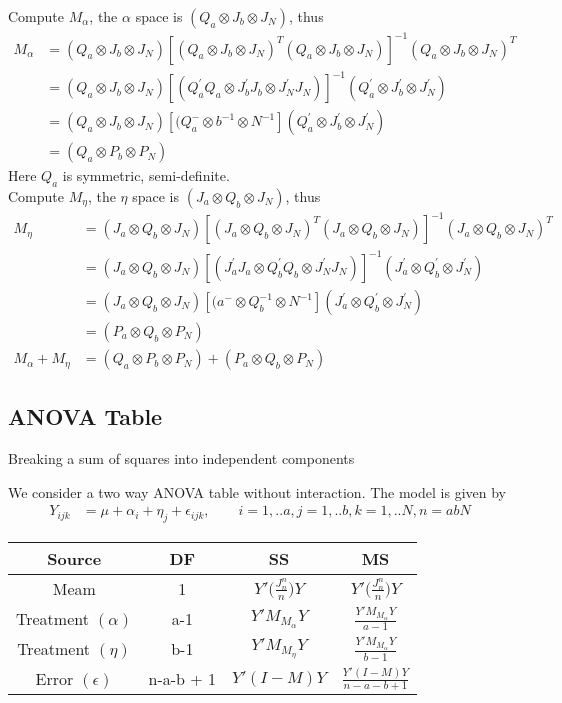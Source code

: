 \begin{itemize}
Compute $M_\alpha$, the $\alpha$ space is $(Q_a \otimes J_b \otimes J_N)$, thus
 \begin{align*}
    M_\alpha &= (Q_a \otimes J_b \otimes J_N) [(Q_a \otimes J_b \otimes J_N)^{T}(Q_a \otimes J_b \otimes J_N)]^{-1} (Q_a \otimes J_b \otimes J_N)^{T}\\
     &= (Q_a \otimes J_b \otimes J_N) [(Q_a ^{'}Q_a\otimes J_b^{'}J_b \otimes J_N^{'}J_N)]^{-1}(Q_a^{'} \otimes J_b^{'} \otimes J_N^{'})\\ 
     &= (Q_a \otimes J_b \otimes J_N) [(Q_a^{-}\otimes b^{-1} \otimes N^{-1}](Q_a^{'} \otimes J_b^{'} \otimes J_N^{'})\\
     & = (Q_a \otimes P_b \otimes P_N) 
\end{align*}
    Here $Q_a$ is symmetric, semi-definite.\\
    Compute $M_\eta$, the $\eta$ space is $(J_a \otimes Q_b \otimes J_N)$, thus
 \begin{align*}
    M_\eta &= (J_a \otimes Q_b \otimes J_N) [(J_a \otimes Q_b \otimes J_N)^{T}(J_a \otimes Q_b \otimes J_N)]^{-1} (J_a \otimes Q_b \otimes J_N)^{T}\\
     &= (J_a \otimes Q_b \otimes J_N) [(J_a ^{'}J_a\otimes Q_b^{'}Q_b \otimes J_N^{'}J_N)]^{-1}(J_a^{'} \otimes Q_b^{'} \otimes J_N^{'})\\
     & = (J_a \otimes Q_b \otimes J_N) [(a^{-}\otimes Q_b^{-1} \otimes N^{-1}](J_a^{'} \otimes Q_b^{'} \otimes J_N^{'})\\
     & = (P_a \otimes Q_b \otimes P_N) \\
     M_\alpha + M_\eta &=(Q_a \otimes P_b \otimes P_N) + (P_a \otimes Q_b \otimes P_N) 
\end{align*}  
\end{itemize}


\subsection{ANOVA Table}

Breaking a sum of squares into independent components

We consider a two way ANOVA table without interaction. The model is given by
 \begin{align*}
    Y_{ijk} &= \mu + \alpha_i + \eta_j + \epsilon_{ijk}, \qquad i=1,..a, j=1,.. b, k=1,..N, n=abN   
\end{align*}

\begin{center}
\begin{tabular}{ |c|c|c|c| } 
 \hline
 Source & DF & SS & MS \\ 
  \hline
 Meam & 1 & $Y' \Big(\frac{J_n^n}{n} \Big) Y$  &$Y' \Big(\frac{J_n^n}{n} \Big) Y$ \\ 
Treatment $(\alpha)$ & a-1 & $Y' M_{M_{\alpha}} Y$ & $ \frac{Y' M_{M_{\alpha}} Y}{a-1}$ \\ 
Treatment $(\eta)$ & b-1 & $Y' M_{M_{\eta}} Y$ & $ \frac{Y' M_{M_{\alpha}} Y}{b-1}$ \\ 
Error $(\epsilon)$ & n-a-b + 1 & $Y' (I-M) Y$ & $ \frac{Y' (I-M) Y}{n-a-b + 1}$ \\ 
 \hline
\end{tabular}
\end{center}


